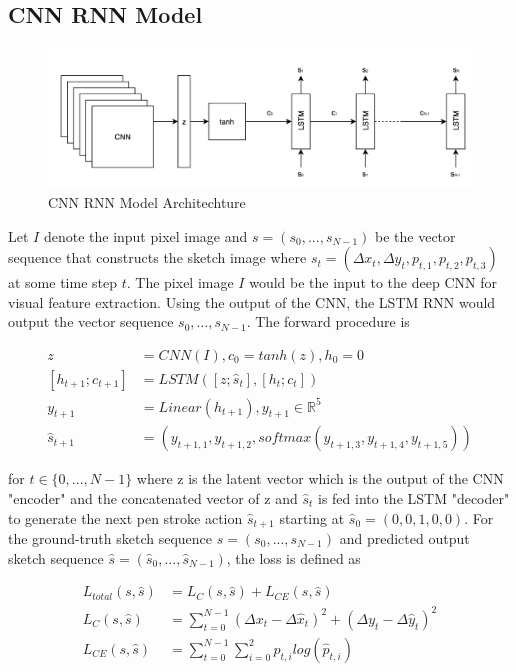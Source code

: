 \documentclass{article}
\begin{document}
\subsection{CNN RNN Model}
\begin{figure}[h]
\centering
\includegraphics[width=12cm]{images/midterm_model.png}
\caption{CNN RNN Model Architechture}
\end{figure}

Let $I$ denote the input pixel image and $s = (s_{0}, ..., s_{N-1})$ be the vector sequence that constructs the sketch image where $s_{t} = (\Delta x_{t}, \Delta y_{t}, p_{t, 1}, p_{t, 2}, p_{t, 3})$ at some time step $t$. The pixel image $I$ would be the input to the deep CNN for visual feature extraction. Using the output of the CNN, the LSTM RNN would output the vector sequence $s_{0}, ..., s_{N-1}$. The forward procedure is

\begin{align*}
z &= CNN(I), c_{0} = tanh(z), h_{0} = 0\\
[h_{t+1}; c_{t+1}] &= LSTM([z;\hat{s}_{t}], [h_{t}; c_{t}])\\
y_{t+1} &= Linear(h_{t+1}), y_{t+1}\in\mathbb{R}^{5}\\
\hat{s}_{t+1} &= (y_{t+1,1}, y_{t+1,2}, softmax(y_{t+1,3}, y_{t+1,4}, y_{t+1,5}))
\end{align*}

for $t\in \{0, ..., N-1\}$ where z is the latent vector which is the output of the CNN "encoder" and the concatenated vector of z and $\hat{s}_{t}$ is fed into the LSTM "decoder" to generate the next pen stroke action $\hat{s}_{t+1}$ starting at $\hat{s}_{0} = (0,0,1,0,0)$. For the ground-truth sketch sequence $s = (s_{0}, ..., s_{N-1})$ and predicted output sketch sequence $\hat{s} = (\hat{s}_{0}, ..., \hat{s}_{N-1})$, the loss is defined as

\begin{align*}
L_{total}(s, \hat{s}) &= L_{C}(s, \hat{s}) + L_{CE}(s, \hat{s})\\
L_{C}(s, \hat{s}) &= \sum_{t=0}^{N-1} (\Delta x_{t} - \Delta \hat{x}_{t})^{2} + (\Delta y_{t} - \Delta \hat{y}_{t})^{2}\\
L_{CE}(s, \hat{s}) &= \sum_{t=0}^{N-1} \sum_{i=0}^{2} p_{t,i} log(\hat{p}_{t,i})
\end{align*}
\end{document}
